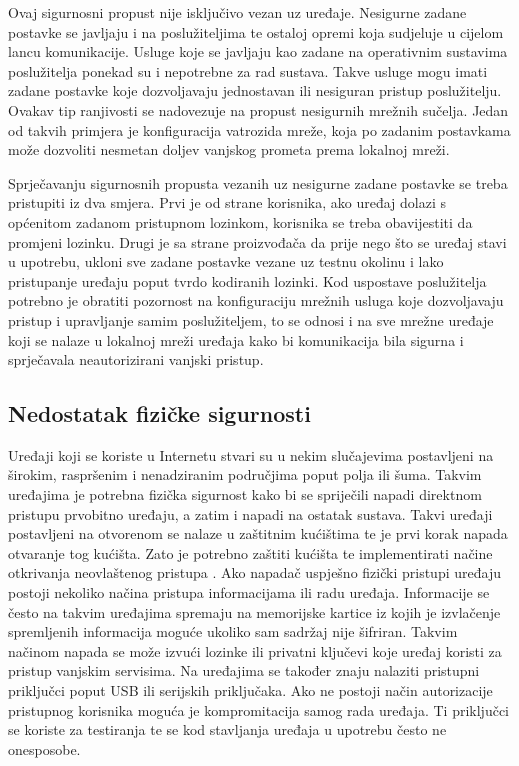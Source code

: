 \documentclass[times, utf8, diplomski]{fer}
\begin{document}
Ovaj sigurnosni propust nije isključivo vezan uz uređaje. Nesigurne zadane postavke se javljaju i na poslužiteljima te ostaloj opremi koja sudjeluje u cijelom lancu komunikacije. Usluge koje se javljaju kao zadane na operativnim sustavima poslužitelja ponekad su i nepotrebne za rad sustava. Takve usluge mogu imati zadane postavke koje dozvoljavaju jednostavan ili nesiguran pristup poslužitelju. Ovakav tip ranjivosti se nadovezuje na propust nesigurnih mrežnih sučelja. Jedan od takvih primjera je konfiguracija vatrozida mreže, koja po zadanim postavkama može dozvoliti nesmetan doljev vanjskog prometa prema lokalnoj mreži.  

Sprječavanju sigurnosnih propusta vezanih uz nesigurne zadane postavke se treba pristupiti iz dva smjera. Prvi je od strane korisnika, ako uređaj dolazi s općenitom zadanom pristupnom lozinkom, korisnika se treba obavijestiti da promjeni lozinku. Drugi je sa strane proizvođača da prije nego što se uređaj stavi u upotrebu, ukloni sve zadane postavke vezane uz testnu okolinu i lako pristupanje uređaju poput tvrdo kodiranih lozinki. Kod uspostave poslužitelja potrebno je obratiti pozornost na konfiguraciju mrežnih usluga koje dozvoljavaju pristup i upravljanje samim poslužiteljem, to se odnosi i na sve mrežne uređaje koji se nalaze u lokalnoj mreži uređaja kako bi komunikacija bila sigurna i sprječavala neautorizirani vanjski pristup.

\subsection{Nedostatak fizičke sigurnosti}
Uređaji koji se koriste u Internetu stvari su u nekim slučajevima postavljeni na širokim, raspršenim  i nenadziranim područjima poput polja ili šuma. Takvim uređajima je potrebna fizička sigurnost kako bi se spriječili napadi direktnom pristupu prvobitno uređaju, a zatim i napadi na ostatak sustava. Takvi uređaji postavljeni na otvorenom se nalaze u zaštitnim kućištima te je prvi korak napada otvaranje tog kućišta. Zato je potrebno zaštiti kućišta te implementirati načine otkrivanja neovlaštenog pristupa . Ako napadač uspješno fizički pristupi uređaju postoji nekoliko načina pristupa informacijama ili radu uređaja. Informacije se često na takvim uređajima spremaju na memorijske kartice iz kojih je izvlačenje spremljenih informacija moguće ukoliko sam sadržaj nije šifriran. Takvim načinom napada se može izvući lozinke ili privatni ključevi koje uređaj koristi za pristup vanjskim servisima. Na uređajima se također znaju nalaziti pristupni priključci poput USB ili serijskih priključaka. Ako ne postoji način autorizacije pristupnog korisnika moguća je kompromitacija samog rada uređaja. Ti priključci se koriste za testiranja te se kod stavljanja uređaja u upotrebu često ne onesposobe.
\end{document}
